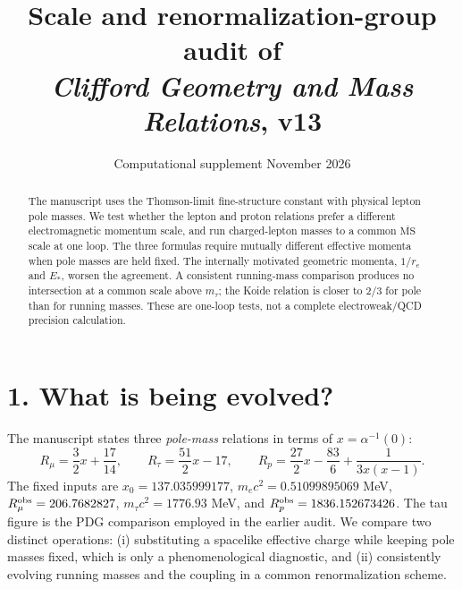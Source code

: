 \documentclass[10pt,a4paper]{article}
\title{Scale and renormalization-group audit of\\\emph{Clifford Geometry and Mass Relations}, v13}
\author{Computational supplement \quad 3 November 2026}
\date{}
\newcommand{\MS}{\overline{\mathrm{MS}}}
\begin{document}
\maketitle\vspace{-2em}
\begin{abstract}
The manuscript uses the Thomson-limit fine-structure constant with physical lepton pole masses. We test whether the lepton and proton relations prefer a different electromagnetic momentum scale, and run charged-lepton masses to a common $\MS$ scale at one loop. The three formulas require mutually different effective momenta when pole masses are held fixed. The internally motivated geometric momenta, $1/r_e$ and $E_*$, worsen the agreement. A consistent running-mass comparison produces no intersection at a common scale above $m_\tau$; the Koide relation is closer to $2/3$ for pole than for running masses. These are one-loop tests, not a complete electroweak/QCD precision calculation.
\end{abstract}
\section*{1. What is being evolved?}
The manuscript states three \emph{pole-mass} relations in terms of $x=\alpha^{-1}(0)$:
\begin{equation}
 R_\mu=\frac32x+\frac{17}{14},\qquad
 R_\tau=\frac{51}{2}x-17,\qquad
 R_p=\frac{27}{2}x-\frac{83}{6}+\frac{1}{3x(x-1)}.
\end{equation}
The fixed inputs are $x_0=137.035999177$, $m_ec^2=0.51099895069$ MeV, $R_\mu^{\rm obs}=206.7682827$, $m_\tau c^2=1776.93$ MeV, and $R_p^{\rm obs}=1836.152673426$. The tau figure is the PDG comparison employed in the earlier audit. We compare two distinct operations: (i) substituting a spacelike effective charge while keeping pole masses fixed, which is only a phenomenological diagnostic, and (ii) consistently evolving running masses and the coupling in a common renormalization scheme.
\end{document}
